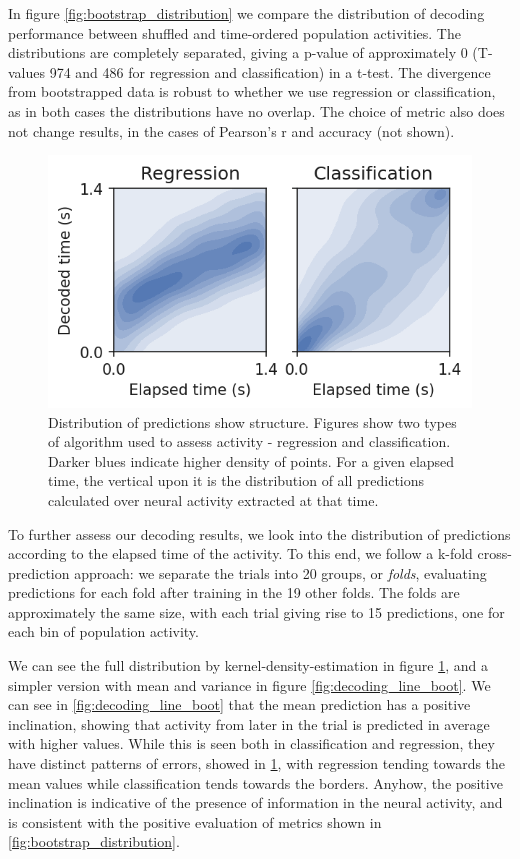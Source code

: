     In figure \ref{fig:bootstrap_distribution} we compare the distribution of decoding performance between shuffled and time-ordered population activities. The distributions are completely separated, giving a p-value of approximately 0 (T-values 974 and 486 for regression and classification) in a t-test. The divergence from bootstrapped data is robust to whether we use regression or classification, as in both cases the distributions have no overlap. The choice of metric also does not change results, in the cases of Pearson's r and accuracy (not shown). 
    
    \begin{figure}[ht]
        \centering
        \includegraphics{figures/clf_reg_kde_simple.png}
        \caption[Distribution of predictions show structure]{Distribution of predictions show structure. Figures show two types of algorithm used to assess activity - regression and classification. Darker blues indicate higher density of points. For a given elapsed time, the vertical upon it is the distribution of all predictions calculated over neural activity extracted at that time.}
        \label{fig:decoding_kde_boot}
    \end{figure}
    
    To further assess our decoding results, we look into the distribution of predictions according to the elapsed time of the activity. To this end, we follow a k-fold cross-prediction approach: we separate the trials into 20 groups, or \textit{folds}, evaluating predictions for each fold after training in the 19 other folds. The folds are approximately the same size, with each trial giving rise to 15 predictions, one for each bin of population activity.
    
    We can see the full distribution by kernel-density-estimation in figure \ref{fig:decoding_kde_boot}, and a simpler version with mean and variance in figure \ref{fig:decoding_line_boot}. We can see in \ref{fig:decoding_line_boot} that the mean prediction has a positive inclination, showing that activity from later in the trial is predicted in average with higher values. While this is seen both in classification and regression, they have distinct patterns of errors, showed in \ref{fig:decoding_kde_boot}, with regression tending towards the mean values while classification tends towards the borders. Anyhow, the positive inclination is indicative of the presence of information in the neural activity, and is consistent with the positive evaluation of metrics shown in \ref{fig:bootstrap_distribution}.
    
